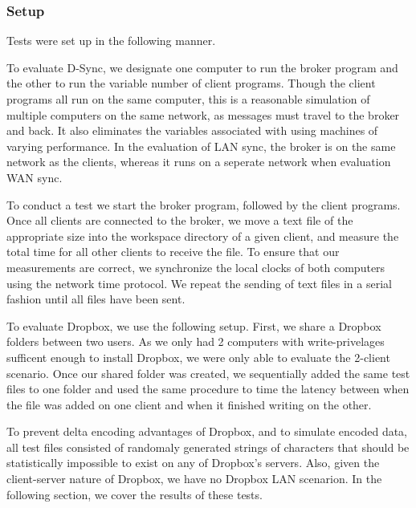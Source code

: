 \subsubsection{Setup}
Tests were set up in the following manner.

To evaluate D-Sync, we designate one
computer to run the broker program
and the other to run the variable number of client programs.
Though the client programs all run on the same computer,
this is a reasonable simulation of multiple computers on the same
network, as messages must travel to the broker and back. It also
eliminates the variables associated with using machines of varying
performance. In the evaluation of LAN sync, the broker is on the same
network as the clients, whereas it runs on a seperate network when
evaluation WAN sync.

To conduct a test we start the broker program, followed by the
client programs.
Once all clients are connected to the broker,
we move a text file of the appropriate
size into the workspace directory of a given client,
and measure the total time for all other clients
to receive the file.
To ensure that our measurements are correct,
we synchronize the local clocks of both computers
using the network time protocol.
We repeat the sending of text files in a serial fashion
until all files have been sent.

To evaluate Dropbox, we use the following setup.
First, we share a Dropbox folders between two users. As we only
had 2 computers with write-privelages sufficent enough to install 
Dropbox, we were only able to evaluate the 2-client scenario. Once 
our shared folder was created, we sequentially added the same test
files to one folder and used the same procedure to time the latency
between when the file was added on one client and when it finished 
writing on the other.

To prevent delta encoding advantages of Dropbox, and to simulate encoded
data, all test files consisted of randomaly generated strings of 
characters that should be statistically impossible to exist
on any of Dropbox's servers. Also, given the client-server nature of
Dropbox, we have no Dropbox LAN scenarion.
In the following section, we cover the results of these tests.

